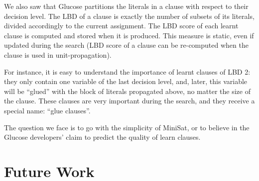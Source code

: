 We also saw that Glucose partitions the literals in a clause with respect to
their decision level. The LBD of a clause is exactly the number of subsets of
its literals, divided accordingly to the current assignment. The LBD score of
each learnt clause is computed and stored when it is produced. This measure is
static, even if updated during the search (LBD score of a clause can be
re-computed when the clause is used in unit-propagation). 

For instance, it is easy to understand the importance of learnt clauses of LBD
2: they only contain one variable of the last decision level, and, later, this
variable will be ``glued'' with the block of literals propagated above, no
matter the size of the clause. These clauses are very important during the
search, and they receive a special name: ``glue clauses''.

The question we face is to go with the simplicity of MiniSat, or to believe in
the Glucose developers' claim to predict the quality of learn clauses.

\section{Future Work}
